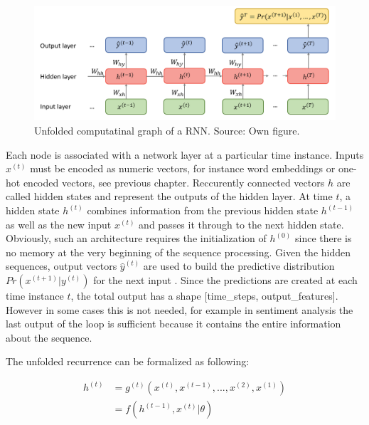 \documentclass[]{krantz}
\begin{document}
\begin{figure}

{\centering \includegraphics[width=1\linewidth]{figures/01-02-rnns-and-their-applications-in-nlp/02_unfolded_graph} 

}

\caption{Unfolded computatinal graph of a RNN. Source: Own figure.}\label{fig:01-02-unfold}
\end{figure}

Each node is associated with a network layer at a particular time instance. Inputs \(x^{(t)}\) must be encoded as numeric vectors, for instance word embeddings or one-hot encoded vectors, see previous chapter. Reccurently connected vectors \(h\) are called hidden states and represent the outputs of the hidden layer. At time \(t\), a hidden state \(h^{(t)}\) combines information from the previous hidden state \(h^{(t-1)}\) as well as the new input \(x^{(t)}\) and passes it through to the next hidden state. Obviously, such an architecture requires the initialization of \(h^{(0)}\) since there is no memory at the very beginning of the sequence processing. Given the hidden sequences, output vectors \(\hat{y}^{(t)}\) are used to build the predictive distribution \(Pr(x^{(t+1)}|y^{(t)})\) for the next input \citep{graves2013generating}. Since the predictions are created at each time instance \(t\), the total output has a shape {[}time\_steps, output\_features{]}. However in some cases this is not needed, for example in sentiment analysis the last output of the loop is sufficient because it contains the entire information about the sequence. \citep{chollet2018deep}

The unfolded recurrence can be formalized as following:

\begin{align}
h^{(t)} & = g^{(t)}(x^{(t)},x^{(t-1)},...,x^{(2)}, x^{(1)}) \\
& = f(h^{(t-1)},x^{(t)}| \theta)  \label{eq:recurrent}
\end{align}
\end{document}
